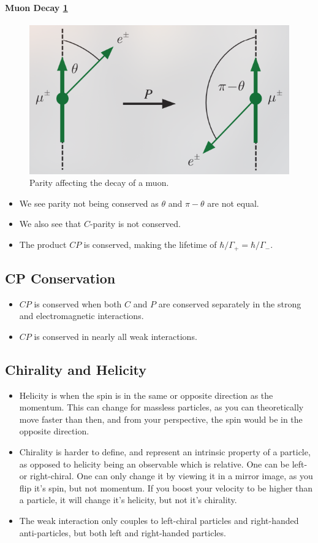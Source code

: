 \paragraph{Muon Decay \cref{fig: muon_symmetry_breaking}}
\begin{figure}
    \centering
    \vspace{-5mm}
    \includegraphics[width = .4\textwidth]{muon_symmetry_breaking.png}
    \caption{Parity affecting the decay of a muon.}
    \label{fig: muon_symmetry_breaking}
\end{figure}
\begin{itemize}
    \item We see parity not being conserved as $θ$ and $π - θ$ are not equal.
    \item We also see that $C$-parity is not conserved. 
    \item The product $CP$ is conserved, making the lifetime of $ℏ/Γ_{+} = ℏ/Γ_{-}$.     
\end{itemize}

\subsection{CP Conservation}
\begin{itemize}
  \item $CP$ is conserved when both $C$ and $P$ are conserved separately in the strong and electromagnetic interactions.
  \item $CP$ is conserved in nearly all weak interactions. 
\end{itemize}

\subsection{Chirality and Helicity}
\begin{itemize}
  \item Helicity is when the spin is in the same or opposite direction as the momentum. This can change for massless particles, as you can theoretically move faster than then, and from your perspective, the spin would be in the opposite direction.
  \item Chirality is harder to define, and represent an intrinsic property of a particle, as opposed to helicity being an observable which is relative. One can be left- or right-chiral. One can only change it by viewing it in a mirror image, as you flip it's spin, but not momentum. If you boost your velocity to be higher than a particle, it will change it's helicity, but not it's chirality.
  \item The weak interaction only couples to left-chiral particles and right-handed anti-particles, but both left and right-handed particles. 
\end{itemize}
